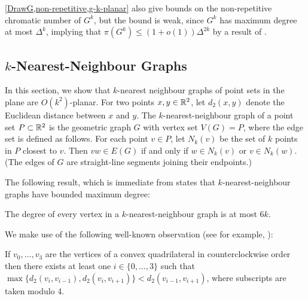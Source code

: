 \documentclass{patmorin}
\newcommand{\note}[2]{{\color{red}[#1:~#2]}}
\renewcommand{\le}{\leqslant}
\renewcommand{\leq}{\leqslant}
\begin{document}
\cref{DrawG,non-repetitive,g-k-planar} also give bounds on the non-repetitive chromatic number of $G^k$, 
but the bound is weak, since $G^k$ has maximum degree at most $\Delta^k$, implying that $\pi(G^k) \leq (1+o(1))\Delta^{2k}$ by a result of \citet{DJKW16}.


\subsection{$k$-Nearest-Neighbour Graphs}

In this section, we show that $k$-nearest neighbour graphs of point sets in the plane are $O(k^2)$-planar.  For two points $x,y\in\mathbb{R}^2$, let $d_2(x,y)$ denote the Euclidean distance between $x$ and $y$. The $k$-nearest-neighbour graph of a point set $P\subset\mathbb{R}^2$ is the geometric graph $G$ with vertex set $V(G)=P$, where the edge set is defined as follows. For each point $v\in P$, let $N_k(v)$ be the set of $k$ points in $P$ closest to $v$. Then $vw\in E(G)$ if and only if $w\in N_k(v)$ or $v\in N_k(w)$. 
(The edges of $G$ are straight-line segments joining their endpoints.)

The following result, which is immediate from \citet[Corollary~4.2.6]{abrego.munroy.ea:on} states that $k$-nearest-neighbour graphs have bounded maximum degree:
\begin{lem}
\label{k-nn-max-degree}
The degree of every vertex in a $k$-nearest-neighbour graph is at most $6k$.
\end{lem}

We make use of the following well-known observation (see for example, \citet[Lemma~2]{bose.morin.ea:routing}):
\begin{obs}
\label{convex}
If $v_0,\ldots,v_3$ are the vertices of a convex quadrilateral in counterclockwise order then there exists at least one $i\in\{0,\ldots,3\}$ such that $\max\{d_2(v_i,v_{i-1}), d_2(v_i,v_{i+1})\} < d_2(v_{i-1},v_{i+1})$, where subscripts are taken modulo 4.
\end{obs}
\end{document}
